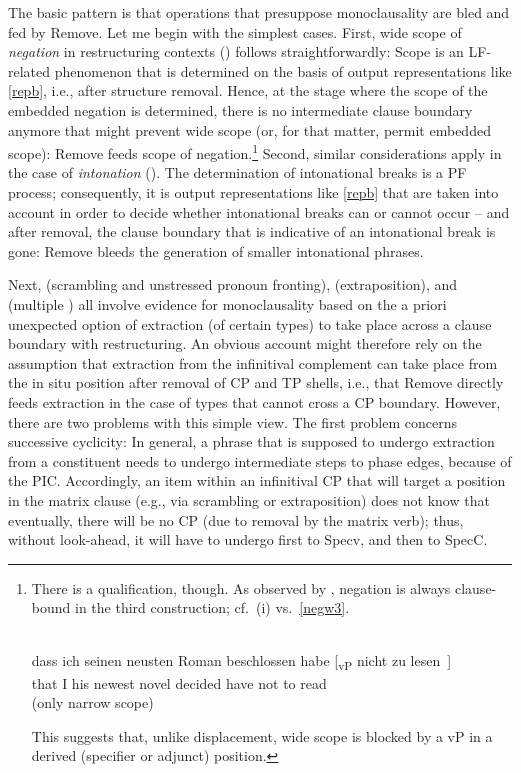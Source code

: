 \documentclass[output=paper]{langsci/langscibook}
\begin{document}
The basic pattern is that operations that presuppose monoclausality are bled
and fed by Remove. Let me begin with the simplest cases. First, wide scope of
{\it negation} in restructuring contexts () follows
straightforwardly: Scope is an \gls{LF}-related phenomenon that is determined
on the basis of output representations like \eqref{repb}, i.e., after structure
removal. Hence, at the stage where the  scope of the embedded negation is
determined, there is no intermediate clause boundary anymore that might prevent
wide scope (or, for that matter, permit embedded scope):  Remove feeds scope of
negation.\footnote{There is a qualification, though. As observed by
    \cite{Santorini&Kroch:91}, negation is always clause-bound in the third
    construction; cf.\ (i) vs.\ \eqref{negw3}.

\begin{exe}
     \\
    \gll dass ich seinen neusten Roman beschlossen habe [\textsubscript{vP} nicht zu lesen~]\\
        that I his newest novel\textsubscript{\Acc} decided have {} not to read\\
    \trans (only narrow scope)
\end{exe}

This suggests that, unlike displacement, wide scope is blocked by a vP in a
derived (specifier or adjunct) position.} Second, similar considerations apply
in the case of {\it intonation} (). The determination of intonational
breaks is a \gls{PF} process; consequently, it is output representations like
\eqref{repb} that are taken into account in order to decide whether
intonational breaks can or cannot occur -- and after  removal, the clause
boundary that is indicative of an intonational break is gone: Remove bleeds the
generation of smaller intonational phrases.

Next,  (scrambling and unstressed pronoun fronting), 
(extraposition), and  (multiple ) all involve evidence for
monoclausality based on the a priori unexpected option of extraction (of
certain  types) to take place across a clause boundary with
restructuring. An obvious account might therefore rely on the assumption that
extraction from the infinitival complement can take place from the in situ
position after removal of CP and TP shells, i.e., that Remove directly feeds
extraction in the case of  types that cannot cross a CP boundary.
However, there are two problems with this simple view.  The first problem
concerns successive cyclicity: In general, a phrase that is supposed to undergo
extraction from a constituent needs to undergo intermediate  steps to
phase edges, because of the \gls{PIC}. Accordingly, an item within an
infinitival CP that will target a position in the matrix clause (e.g., via
scrambling or extraposition) does not know that eventually, there will be no CP
(due to removal by the matrix verb); thus, without look-ahead, it will have to
undergo  first to Specv, and then to SpecC.
\end{document}
